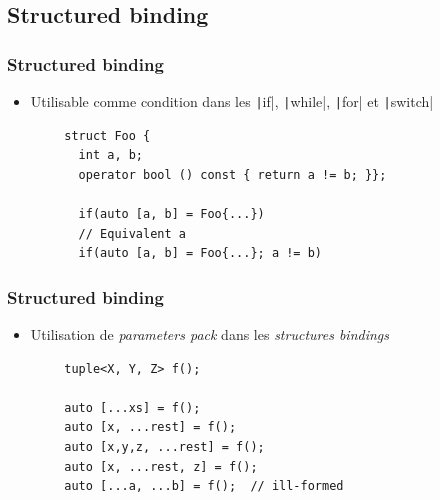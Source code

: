 \documentclass[C++.tex]{subfiles}
\begin{document}
\subsection*{Structured binding}
\begin{frame}[fragile]
	\frametitle{Structured binding}
	\begin{itemize}
		\item Utilisable comme condition dans les \texttt|if|, \texttt|while|, \texttt|for| et \texttt|switch|
	\end{itemize}

	\begin{verbatim}
		struct Foo {
		  int a, b;
		  operator bool () const { return a != b; }};

		  if(auto [a, b] = Foo{...})
		  // Equivalent a
		  if(auto [a, b] = Foo{...}; a != b)
	\end{verbatim}


\end{frame}

\begin{frame}[fragile]
	\frametitle{Structured binding}
	\begin{itemize}
		\item Utilisation de \textit{parameters pack} dans les \textit{structures bindings}
	\end{itemize}

	\begin{verbatim}
		tuple<X, Y, Z> f();

		auto [...xs] = f();
		auto [x, ...rest] = f();
		auto [x,y,z, ...rest] = f();
		auto [x, ...rest, z] = f();
		auto [...a, ...b] = f();  // ill-formed
	\end{verbatim}

\end{frame}
\end{document}
